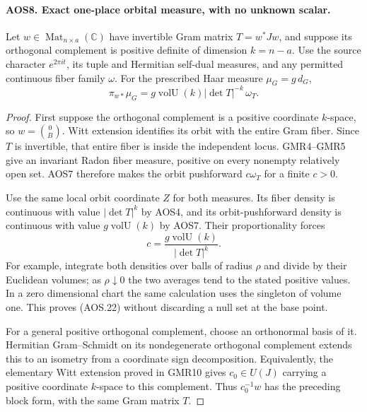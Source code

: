 \paragraph{AOS8. Exact one-place orbital measure, with no unknown scalar.}
\label{claim:AOS8}
Let $w\in\operatorname{Mat}_{n\times a}(\mathbb C)$ have invertible
Gram matrix $T=w^*Jw$, and suppose its orthogonal complement is
positive definite of dimension $k=n-a$.  Use the source character
$e^{2\pi it}$, its tuple and Hermitian self-dual measures, and any
permitted continuous fiber family $\omega$.  For the prescribed
Haar measure $\mu_G=g\,d_G$,
\[
            \pi_{w*}\mu_G
                 =g\operatorname{volU}(k)|\det T|^{-k}\,\omega_T.
 \tag{AOS.22}
\]

\begin{proof}
First suppose the orthogonal complement is a positive coordinate
$k$-space, so $w=\binom0B$.  Witt extension identifies its orbit
with the entire Gram fiber.  Since $T$ is invertible, that entire
fiber is inside the independent locus.  GMR4--GMR5 give an invariant
Radon fiber measure, positive on every nonempty relatively open set.
AOS7 therefore makes the orbit pushforward $c\omega_T$ for a finite
$c>0$.

Use the same local orbit coordinate $Z$ for both measures.  Its
fiber density is continuous with value $|\det T|^k$ by AOS4, and
its orbit-pushforward density is continuous with value
$g\operatorname{volU}(k)$ by AOS7.  Their proportionality forces
\[
       c=\frac{g\operatorname{volU}(k)}{|\det T|^k}.
\]
For example, integrate both densities over balls of radius $\rho$
and divide by their Euclidean volumes; as $\rho\downarrow0$ the
two averages tend to the stated positive values.  In a zero
dimensional chart the same calculation uses the singleton of
volume one.  This proves (AOS.22) without discarding a null set at
the base point.

For a general positive orthogonal complement, choose an orthonormal
basis of it.  Hermitian Gram--Schmidt on its nondegenerate
orthogonal complement extends this to an isometry from a coordinate
sign decomposition.  Equivalently, the elementary Witt extension
proved in GMR10 gives $c_0\in U(J)$ carrying a positive coordinate
$k$-space to this complement.  Thus $c_0^{-1}w$ has the preceding
block form, with the same Gram matrix $T$.


\end{proof}
